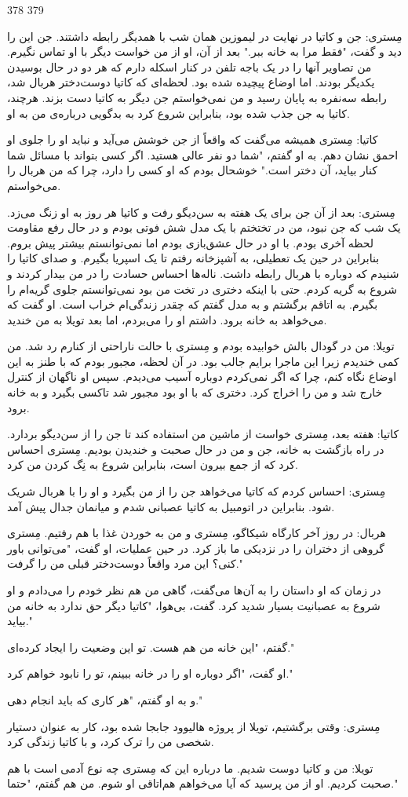 378 379

مِستری: جن و کاتیا در نهایت در لیموزین همان شب با همدیگر رابطه داشتند. جن این را دید و گفت، "فقط مرا به خانه ببر." بعد از آن، او از من خواست دیگر با او تماس نگیرم. من تصاویر آنها را در یک باجه تلفن در کنار اسکله دارم که هر دو در حال بوسیدن یکدیگر بودند. اما اوضاع پیچیده شده بود. لحظه‌ای که کاتیا دوست‌دختر هربال شد، رابطه‌ سه‌نفره به پایان رسید و من نمی‌خواستم جن دیگر به کاتیا دست بزند. هرچند، کاتیا به جن جذب شده بود، بنابراین شروع کرد به بدگویی درباره‌ی من به او.

کاتیا: مِستری همیشه می‌گفت که واقعاً از جن خوشش می‌آید و نباید او را جلوی او احمق نشان دهم. به او گفتم، "شما دو نفر عالی هستید. اگر کسی بتواند با مسائل شما کنار بیاید، آن دختر است." خوشحال بودم که او کسی را دارد، چرا که من هربال را می‌خواستم.

مِستری: بعد از آن جن برای یک هفته به سن‌دیگو رفت و کاتیا هر روز به او زنگ می‌زد. یک شب که جن نبود، من در تختختم با یک مدل شش‌ فوتی بودم و در حال رفع مقاومت لحظه آخری بودم. با او در حال عشق‌بازی بودم اما نمی‌توانستم بیشتر پیش بروم. بنابراین در حین یک تعطیلی، به آشپزخانه رفتم تا یک اسپریا بگیرم. و صدای کاتیا را شنیدم که دوباره با هربال رابطه داشت. ناله‌ها احساس حسادت را در من بیدار کردند و شروع به گریه کردم. حتی با اینکه دختری در تخت من بود نمی‌توانستم جلوی گریه‌ام را بگیرم. به اتاقم برگشتم و به مدل گفتم که چقدر زندگی‌ام خراب است. او گفت که می‌خواهد به خانه برود. داشتم او را می‌بردم، اما بعد تویلا به من خندید.

تویلا: من در گودال بالش خوابیده بودم و مِستری با حالت ناراحتی از کنارم رد شد. من کمی خندیدم زیرا این ماجرا برایم جالب بود. در آن لحظه، مجبور بودم که با طنز به این اوضاع نگاه کنم، چرا که اگر نمی‌کردم دوباره آسیب می‌دیدم. سپس او ناگهان از کنترل خارج شد و من را اخراج کرد. دختری که با او بود مجبور شد تاکسی بگیرد و به خانه برود.

کاتیا: هفته بعد، مِستری خواست از ماشین من استفاده کند تا جن را از سن‌دیگو بردارد. در راه بازگشت به خانه، جن و من در حال صحبت و خندیدن بودیم. مِستری احساس کرد که از جمع بیرون است، بنابراین شروع به نِگ کردن من کرد.

مِستری: احساس کردم که کاتیا می‌خواهد جن را از من بگیرد و او را با هربال شریک شود. بنابراین در اتومبیل به کاتیا عصبانی شدم و میانمان جدال پیش آمد.

هربال: در روز آخر کارگاه شیکاگو، مِستری و من به خوردن غذا با هم رفتیم. مِستری گروهی از دختران را در نزدیکی ما باز کرد. در حین عملیات، او گفت، "می‌توانی باور کنی؟ این مرد واقعاً دوست‌دختر قبلی من را گرفت."

در زمان که او داستان را به آن‌ها می‌گفت، گاهی من هم نظر خودم را می‌دادم و او شروع به عصبانیت بسیار شدید کرد. گفت، بی‌هوا، "کاتیا دیگر حق ندارد به خانه من بیاید."

گفتم، "این خانه من هم هست. تو این وضعیت را ایجاد کرده‌ای."

او گفت، "اگر دوباره او را در خانه ببینم، تو را نابود خواهم کرد."

و به او گفتم، "هر کاری که باید انجام دهی."

مِستری: وقتی برگشتیم، تویلا از پروژه هالیوود جابجا شده بود، کار به عنوان دستیار شخصی من را ترک کرد، و با کاتیا زندگی کرد.

تویلا: من و کاتیا دوست شدیم. ما درباره این که مِستری چه نوع آدمی است با هم صحبت کردیم. او از من پرسید که آیا می‌خواهم هم‌اتاقی او شوم. من هم گفتم، "حتما."